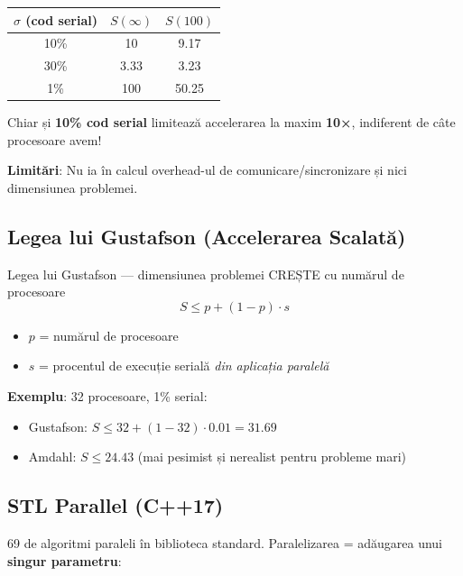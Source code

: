 \documentclass[a4paper,11pt]{article}
\newcommand{\thead}[1]{\cellcolor{tblheader}\color{white}\textbf{#1}}
\begin{document}
\begin{center}
\begin{tabular}{ccc}
\toprule
\thead{$\sigma$ (cod serial)} & \thead{$S(\infty)$} & \thead{$S(100)$} \\
\midrule
10\% & 10 & 9.17 \\
30\% & 3.33 & 3.23 \\
1\% & 100 & 50.25 \\
\bottomrule
\end{tabular}
\end{center}

\begin{tipbox}
Chiar și \textbf{10\% cod serial} limitează accelerarea la maxim \textbf{10×}, indiferent de câte procesoare avem!

\textbf{Limitări}: Nu ia în calcul overhead-ul de comunicare/sincronizare și nici dimensiunea problemei.
\end{tipbox}

\subsection{Legea lui Gustafson (Accelerarea Scalată)}

\begin{defbox}{Legea lui Gustafson — dimensiunea problemei CREȘTE cu numărul de procesoare}
\[
S \leq p + (1 - p) \cdot s
\]
\begin{itemize}[noitemsep]
  \item $p$ = numărul de procesoare
  \item $s$ = procentul de execuție serială \emph{din aplicația paralelă}
\end{itemize}
\end{defbox}

\textbf{Exemplu}: 32 procesoare, 1\% serial:
\begin{itemize}[noitemsep]
  \item Gustafson: $S \leq 32 + (1 - 32) \cdot 0.01 = 31.69$
  \item Amdahl: $S \leq 24.43$ (mai pesimist și nerealist pentru probleme mari)
\end{itemize}

\subsection{STL Parallel (C++17)}

69 de algoritmi paraleli în biblioteca standard. Paralelizarea = adăugarea unui \textbf{singur parametru}:
\end{document}
